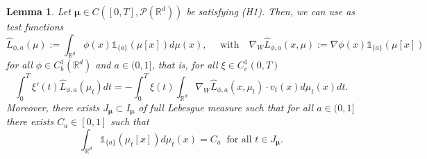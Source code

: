 \documentclass[10pt,leqno]{amsart}
\numberwithin{equation}{section}
\newtheorem{lemma}[teorema]{Lemma}
\newcommand{\R}{\mathbb{R}}
\newcommand{\PP}{\mathcal{P}}
\begin{document}
\begin{lemma}\label{lemma: dual with indicators}
    Let $\boldsymbol{\mu}\in C([0,T],\PP(\R^d))$ be satisfying (H1).
    Then, we can use as test functions 
    \begin{equation}
        \hat{L}_{\phi,a}(\mu):= \int_{\R^d} \phi(x) \mathds{1}_{\{a\}}(\mu[x]) d\mu(x), \quad \text{ with} \quad \nabla_W \hat{L}_{\phi,a}(x,\mu) := \nabla \phi(x) \mathds{1}_{\{a\}}(\mu[x])
    \end{equation}
    for all $\phi\in C_b^1(\R^d)$ and $a\in (0,1]$, that is, for all $\xi \in C_c^1(0,T)$
    \begin{equation}
        \int_0^T \xi'(t)\hat{L}_{\phi,a}(\mu_t) dt = - \int_0^T \xi(t) \int_{\R^d} \nabla_W \hat{L}_{\phi,a}(x,\mu_t)\cdot v_t(x) d\mu_t(x) dt.
    \end{equation}
    Moreover, there exists $J_{\boldsymbol{\mu}}\subset I_{\boldsymbol{\mu}}$ of full Lebesgue measure such that for all $a\in(0,1]$ there exists $C_a \in [0,1]$ such that
    \begin{equation}\label{eq: const on J_mu}
    \int_{\R^d} \mathds{1}_{\{a\}}(\mu_t[x]) d\mu_t(x) = C_a \ \text{ for all }t\in J_{\boldsymbol{\mu}}. 
    \end{equation}
\end{lemma}
\end{document}
